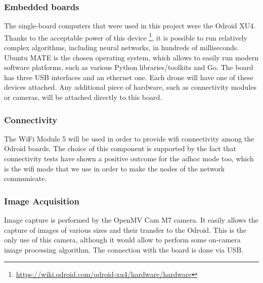 \documentclass[10pt,conference,compsocconf]{IEEEtran}
\begin{document}
\subsubsection{Embedded boards}
The single-board computers that were used in this project were the Odroid XU4. Thanks to the acceptable power of this device \footnote{\url{https://wiki.odroid.com/odroid-xu4/hardware/hardware}}, it is possible to run relatively complex algorithms, including neural networks, in hundreds of milliseconds. Ubuntu MATE is the chosen operating system, which allows to easily run modern software platforms, such as various Python libraries/toolkits and Go. The board has three USB interfaces and an ethernet one. Each drone will have one of these devices attached. Any additional piece of hardware, such as connectivity modules or cameras, will be attached directly to this board.
\subsubsection{Connectivity}
The WiFi Module 5 will be used in order to provide wifi connectivity among the Odroid boards. The choice of this component is supported by the fact that connectivity tests have shown a positive outcome for the adhoc mode too, which is the wifi mode that we use in order to make the nodes of the network communicate.
\subsubsection{Image Acquisition}
Image capture is performed by the OpenMV Cam M7 camera. It easily allows the capture of images of various sizes and their transfer to the Odroid. This is the only use of this camera, although it would allow to perform some on-camera image processing algorithm. The connection with the board is done via USB.
\end{document}

